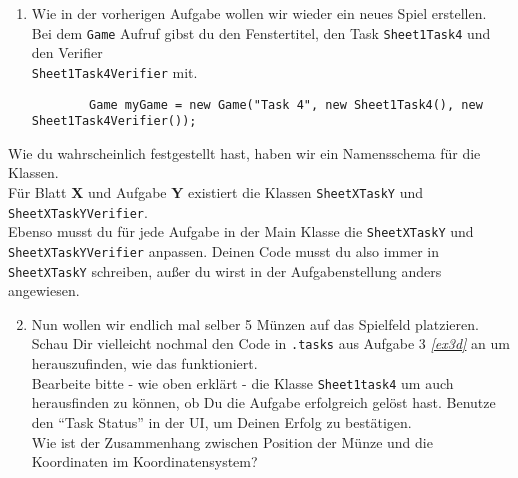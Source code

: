 
\def\PlayFieldModifierDocLinkSuffix{de.unistuttgart.informatik.fius.icge.simulation/de/unistuttgart/informatik/fius/icge/simulation/tools/PlayfieldModifier.html}

\label{ex4}

\begin{enumerate}
    \item Wie in der vorherigen Aufgabe wollen wir wieder ein neues Spiel erstellen.\\
    Bei dem \lstinline{Game} Aufruf gibst du den Fenstertitel, den Task \lstinline{Sheet1Task4} und den Verifier\\\lstinline{Sheet1Task4Verifier} mit.

    \begin{lstlisting}
		Game myGame = new Game("Task 4", new Sheet1Task4(), new Sheet1Task4Verifier());
    \end{lstlisting}
\end{enumerate}

\begin{Infobox}
    Wie du wahrscheinlich festgestellt hast, haben wir ein Namensschema für die Klassen.\\
    Für Blatt \textbf{X} und Aufgabe \textbf{Y} existiert die Klassen \lstinline{SheetXTaskY} und \lstinline{SheetXTaskYVerifier}.\\
    Ebenso musst du für jede Aufgabe in der Main Klasse die \lstinline{SheetXTaskY} und \lstinline{SheetXTaskYVerifier} anpassen.
    Deinen Code musst du also immer in \lstinline{SheetXTaskY} schreiben, außer du wirst in der Aufgabenstellung anders angewiesen.
\end{Infobox}

\begin{enumerate}
	\setcounter{enumi}{1}
    \item Nun wollen wir endlich mal selber 5 Münzen auf das Spielfeld platzieren.
	Schau Dir vielleicht nochmal den Code in \texttt{\javaPackageName.tasks} aus Aufgabe 3 \textit{\ref{ex3d}} an um herauszufinden, wie das funktioniert.\\
	Bearbeite bitte - wie oben erklärt - die Klasse \lstinline{Sheet1task4} um auch herausfinden zu können, ob Du die Aufgabe erfolgreich gelöst hast. Benutze den \enquote{Task Status} in der UI, um Deinen Erfolg zu bestätigen.\\
	Wie ist der Zusammenhang zwischen Position der Münze und die Koordinaten im Koordinatensystem?
\end{enumerate}

